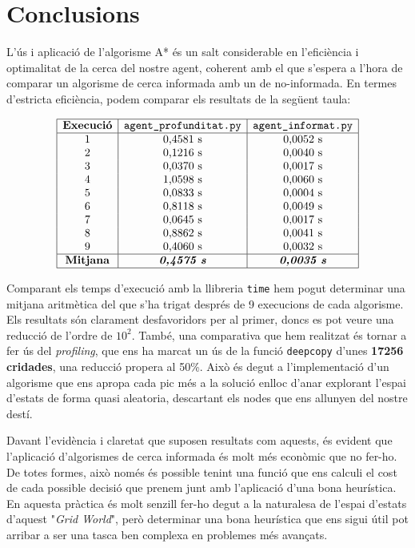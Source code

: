 \documentclass{article}
\begin{document}
\section{Conclusions}\label{sec:conclusions}
L'ús i aplicació de l’algorisme A* és un salt considerable en l’eficiència i optimalitat de la cerca del nostre agent, coherent amb el que s'espera a l'hora de comparar un algorisme de cerca informada amb un de no-informada. En termes d'estricta eficiència, podem comparar els resultats de la següent taula:
\begin{table}[h]
\centering
$$
\begin{array}{|c|c|c|}
\hline
\text{\textbf{Execució}} & \verb|agent_profunditat.py| & \verb|agent_informat.py| \\
\hline
\text{1} & \text{0,4581 s} & \text{0,0052 s} \\
\text{2} & \text{0,1216 s} & \text{0,0040 s} \\
\text{3} & \text{0,0370 s} & \text{0,0017 s} \\
\text{4} & \text{1,0598 s} & \text{0,0060 s} \\
\text{5} & \text{0,0833 s} & \text{0,0004 s} \\
\text{6} & \text{0,8118 s} & \text{0,0049 s} \\
\text{7} & \text{0,0645 s} & \text{0,0017 s} \\
\text{8} & \text{0,8862 s} & \text{0,0041 s} \\
\text{9} & \text{0,4060 s} & \text{0,0032 s} \\
\hline
\text{\textbf{Mitjana}} & \text{\textit{\textbf{0,4575 s}}} & \text{\textit{\textbf{0,0035 s}}} \\
\hline
\end{array}
$$
\end{table}

Comparant els temps d'execució amb la llibreria \verb|time| hem pogut determinar una mitjana aritmètica del que s'ha trigat després de 9 execucions de cada algorisme. Els resultats són clarament desfavoridors per al primer, doncs es pot veure una reducció de l'ordre de $10^2$. També, una comparativa que hem realitzat és tornar a fer ús del \textit{profiling}, que ens ha marcat un ús de la funció \verb|deepcopy| d'unes \textbf{17256 cridades}, una reducció propera al 50\%. Això és degut a l'implementació d'un algorisme que ens apropa cada pic més a la solució enlloc d'anar explorant l'espai d'estats de forma quasi aleatoria, descartant els nodes que ens allunyen del nostre destí.

Davant l'evidència i claretat que suposen resultats com aquests, és evident que l'aplicació d'algorismes de cerca informada és molt més econòmic que no fer-ho. De totes formes, això només és possible tenint una funció que ens calculi el cost de cada possible decisió que prenem junt amb l'aplicació d'una bona heurística. En aquesta pràctica és molt senzill fer-ho degut a la naturalesa de l'espai d'estats d'aquest "\textit{Grid World}", però determinar una bona heurística que ens sigui útil pot arribar a ser una tasca ben complexa en problemes més avançats.
\end{document}
